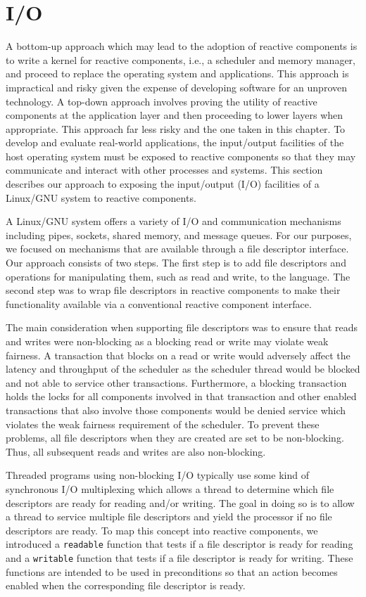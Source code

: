 \section{I/O}

A bottom-up approach which may lead to the adoption of reactive components is to write a kernel for reactive components, i.e., a scheduler and memory manager, and proceed to replace the operating system and applications.
This approach is impractical and risky given the expense of developing software for an unproven technology.
A top-down approach involves proving the utility of reactive components at the application layer and then proceeding to lower layers when appropriate.
This approach far less risky and the one taken in this chapter.
To develop and evaluate real-world applications, the input/output facilities of the host operating system must be exposed to reactive components so that they may communicate and interact with other processes and systems.
This section describes our approach to exposing the input/output (I/O) facilities of a Linux/GNU system to reactive components.

A Linux/GNU system offers a variety of I/O and communication mechanisms including pipes, sockets, shared memory, and message queues.
For our purposes, we focused on mechanisms that are available through a file descriptor interface.
Our approach consists of two steps.
The first step is to add file descriptors and operations for manipulating them, such as read and write, to the language.
The second step was to wrap file descriptors in reactive components to make their functionality available via a conventional reactive component interface.

The main consideration when supporting file descriptors was to ensure that reads and writes were non-blocking as a blocking read or write may violate weak fairness.
A transaction that blocks on a read or write would adversely affect the latency and throughput of the scheduler as the scheduler thread would be blocked and not able to service other transactions.
Furthermore, a blocking transaction holds the locks for all components involved in that transaction and other enabled transactions that also involve those components would be denied service which violates the weak fairness requirement of the scheduler.
To prevent these problems, all file descriptors when they are created are set to be non-blocking.
Thus, all subsequent reads and writes are also non-blocking.

Threaded programs using non-blocking I/O typically use some kind of synchronous I/O multiplexing which allows a thread to determine which file descriptors are ready for reading and/or writing.
The goal in doing so is to allow a thread to service multiple file descriptors and yield the processor if no file descriptors are ready.
To map this concept into reactive components, we introduced a \verb+readable+ function that tests if a file descriptor is ready for reading and a \verb+writable+ function that tests if a file descriptor is ready for writing.
These functions are intended to be used in preconditions so that an action becomes enabled when the corresponding file descriptor is ready.


